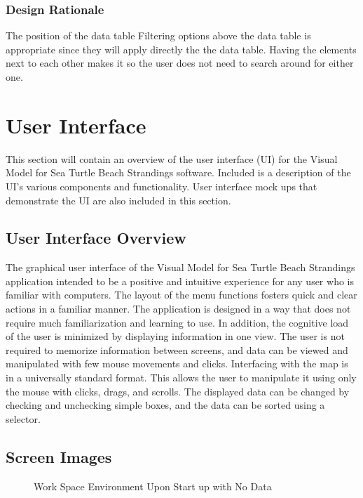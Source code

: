 \documentclass[onecolumn, draftclsnofoot,10pt, compsoc]{IEEEtran}
\begin{document}
\begin{singlespace}
        \subsubsection{Design Rationale}
        The position of the data table Filtering options above the data table is appropriate since they will apply directly the the data table. Having the elements next to each other makes it so the user does not need to search around for either one. 
\pagebreak
\section{User Interface}
    This section will contain an overview of the user interface (UI) for the Visual Model for Sea Turtle Beach Strandings software. Included is a description of the UI's various components and functionality. User interface mock ups that demonstrate the UI are also included in this section. 
        
    \subsection{User Interface Overview}
    The graphical user interface of the Visual Model for Sea Turtle Beach Strandings application intended to be a positive and intuitive experience for any user who is familiar with computers.  The layout of the menu functions fosters quick and clear actions in a familiar manner. The application is designed in a way that does not require much familiarization and learning to use.  In addition, the cognitive load of the user is minimized by displaying information in one view.  The user is not required to memorize information between screens, and data can be viewed and manipulated with few mouse movements and clicks.  Interfacing with the map is in a universally standard format.  This allows the user to manipulate it using only the mouse with clicks, drags, and scrolls.  The displayed data can be changed by checking and unchecking simple boxes, and the data can be sorted using a selector.
    
    \subsection{Screen Images}
        \begin{figure}[H]
        \caption{Work Space Environment Upon Start up with No Data}
        \label{fig:Mockup1}
        \end{figure}
        

\end{singlespace}
\end{document}
